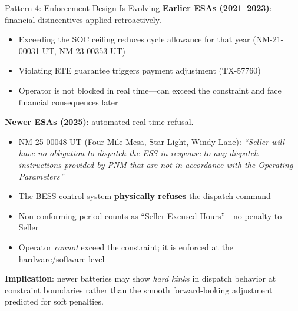 \begin{frame}{Pattern 4: Enforcement Design Is Evolving}
\textbf{Earlier ESAs (2021--2023)}: financial disincentives applied retroactively.
\begin{itemize}
    \item Exceeding the SOC ceiling reduces cycle allowance for that year (NM-21-00031-UT, NM-23-00353-UT)
    \item Violating RTE guarantee triggers payment adjustment (TX-57760)
    \item Operator is not blocked in real time---can exceed the constraint and face financial consequences later
\end{itemize}

\vspace{0.3cm}
\pause
\textbf{Newer ESAs (2025)}: automated real-time refusal.
\begin{itemize}
    \item NM-25-00048-UT (Four Mile Mesa, Star Light, Windy Lane): \textit{``Seller will have no obligation to dispatch the ESS in response to any dispatch instructions provided by PNM that are not in accordance with the Operating Parameters''}
    \item The BESS control system \textbf{physically refuses} the dispatch command
    \item Non-conforming period counts as ``Seller Excused Hours''---no penalty to Seller
    \item Operator \textit{cannot} exceed the constraint; it is enforced at the hardware/software level
\end{itemize}
\vspace{0.2cm}
\pause
\textbf{Implication}: newer batteries may show \textit{hard kinks} in dispatch behavior at constraint boundaries rather than the smooth forward-looking adjustment predicted for soft penalties.
\end{frame}
